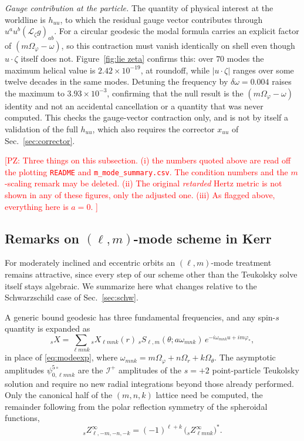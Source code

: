 \documentclass[%
reprint,
 prd,
superscriptaddress,
nofootinbib,
aps,
dvipsnames
]{revtex4-2}
\newcommand{\PZ}[1]{\textcolor{red}{\textsf{[PZ: #1]}}}
\newcommand{\Lie}{{\mathcal L}}
\newcommand{\emm}{m}
\def\l{\ensuremath{\ell}}                          %
\newcommand{\Zinf}[2]{{}_{#1}Z^{\infty}_{#2}}
\newcommand{\psifiveM}[1]{\psi^{5\circ}_{0,#1}}       %
\def\lmnk{\l \emm n k}
\def\wmnk{\omega_{\emm n k}}
\newcommand{\sSS}[3]{{}_{#1}S_{#2,#3}}
\def\scri{\mathscr{I}^{+}}
\begin{document}
\emph{Gauge contribution at the particle.} The quantity of physical interest
at the worldline is $h_{uu}$, to which the residual gauge vector contributes
through $u^{a}u^{b}(\Lie_{\zeta}g)_{ab}$. For a circular geodesic the modal
formula carries an explicit factor of $(m\Omega_{\varphi}-\omega)$, so this
contraction must vanish identically on shell even though $u\cdot\zeta$ itself
does not. Figure~\ref{fig:lie zeta} confirms this: over $70$ modes the maximum
helical value is $2.42\times10^{-19}$, at roundoff, while $|u\cdot\zeta|$
ranges over some twelve decades in the same modes. Detuning the frequency by
$\delta\omega=0.004$ raises the maximum to $3.93\times10^{-3}$, confirming
that the null result is the $(m\Omega_{\varphi}-\omega)$ identity and not an
accidental cancellation or a quantity that was never computed. This checks the
gauge-vector contraction only, and is not by itself a validation of the full
$h_{uu}$, which also requires the corrector $x_{uu}$ of
Sec.~\ref{sec:corrector}.

\PZ{Three things on this subsection. (i) the numbers quoted above are read off the
plotting \texttt{README} and \texttt{m\_mode\_summary.csv}. The condition
numbers and the $m$-scaling remark may be deleted. (ii) The original \emph{retarded} Hertz
metric is not shown in any of these figures, only the adjusted one. (iii) As flagged above, everything here is $a=0$. }

\subsection{Remarks on $(\ell,m)$-mode scheme in Kerr}
\label{sec:lm kerr}

For moderately inclined and eccentric orbits an $(\ell,m)$-mode treatment
remains attractive, since every step of our scheme other than the Teukolsky
solve itself stays algebraic. We summarize here what changes relative to the
Schwarzschild case of Sec.~\ref{sec:schw}.

A generic bound geodesic has three fundamental frequencies, and any
spin-$s$ quantity is expanded as
\begin{equation}\label{eq:modeexp generic}
  {}_s X = \sum_{\ell \emm n k} {}_s X_{\lmnk}(r)\,
  \sSS{s}{\ell}{\emm}(\theta;a\wmnk)\,
  e^{-i\wmnk u + i\emm\varphi_*},
\end{equation}
in place of \eqref{eq:modeexp}, where
$\wmnk = \emm\Omega_{\varphi} + n\Omega_{r} + k\Omega_{\theta}$. The asymptotic amplitudes
$\psifiveM{\lmnk}$ are the $\scri$ amplitudes of the $s=+2$ point-particle
Teukolsky solution and require no new radial integrations beyond those
already performed. Only the canonical half of the $(\emm,n,k)$ lattice need
be computed, the remainder following from the polar reflection symmetry of
the spheroidal functions,
\begin{equation}\label{eq:Z symmetry generic}
  \Zinf{s}{\ell,-\emm,-n,-k} = (-1)^{\ell+k}\,\big(\Zinf{s}{\lmnk}\big)^{*} .
\end{equation}
\end{document}

